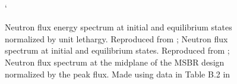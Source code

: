 \begin{figure}[!htpb]
    \centering
    \\`
    \caption[Side-by-side results of MSBR spectra between Ryhklevskii et al, (2019) and Park et al. (2015)]{
     Neutron flux energy spectrum at
    initial and equilibrium states normalized by unit lethargy. Reproduced
    from \cite{rykhlevskii_modeling_2019}; 
    Neutron flux spectrum at initial and equilibrium states. Reproduced from
    \cite{park_whole_2015};  Neutron flux
    spectrum at the midplane of the MSBR design normalized by the peak flux. Made using data in Table B.2 in \cite{robertson_conceptual_1971}}
    \label{fig:msbr_spectrum_comp}
\end{figure}

